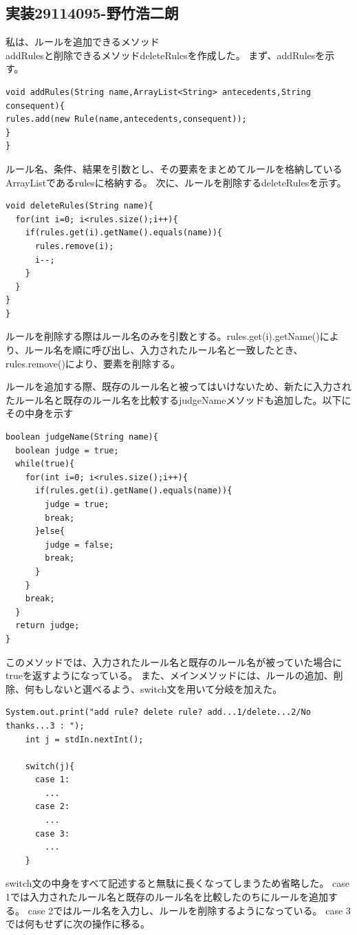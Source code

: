 \documentclass{jarticle}
\begin{document}
\subsection{実装29114095-野竹浩二朗}
私は、ルールを追加できるメソッド\\
addRulesと削除できるメソッドdeleteRulesを作成した。
まず、addRulesを示す。
\begin{lstlisting}[caption=addRulesメソッド]
void addRules(String name,ArrayList<String> antecedents,String consequent){
rules.add(new Rule(name,antecedents,consequent));
}
}
\end{lstlisting}
ルール名、条件、結果を引数とし、その要素をまとめてルールを格納しているArrayListであるrulesに格納する。
次に、ルールを削除するdeleteRulesを示す。
\begin{lstlisting}[caption=deleteRulesメソッド]
void deleteRules(String name){
  for(int i=0; i<rules.size();i++){
    if(rules.get(i).getName().equals(name)){
      rules.remove(i);
      i--;
    }
  }
}
}
\end{lstlisting}
ルールを削除する際はルール名のみを引数とする。rules.get(i).getName()により、ルール名を順に呼び出し、入力されたルール名と一致したとき、rules.remove()により、要素を削除する。

ルールを追加する際、既存のルール名と被ってはいけないため、新たに入力されたルール名と既存のルール名を比較するjudgeNameメソッドも追加した。以下にその中身を示す
\begin{lstlisting}[caption=judgenameメソッド]
boolean judgeName(String name){
  boolean judge = true;
  while(true){
    for(int i=0; i<rules.size();i++){
      if(rules.get(i).getName().equals(name)){
        judge = true;
        break;
      }else{
        judge = false;
        break;
      }
    }
    break;
  }
  return judge;
}
\end{lstlisting}
このメソッドでは、入力されたルール名と既存のルール名が被っていた場合にtrueを返すようになっている。
また、メインメソッドには、ルールの追加、削除、何もしないと選べるよう、switch文を用いて分岐を加えた。
\begin{lstlisting}[caption=メインメソッドに追加した文]
    System.out.print("add rule? delete rule? add...1/delete...2/No thanks...3 : ");
    int j = stdIn.nextInt();

    switch(j){
      case 1:
		...
      case 2:
      	...
      case 3:
      	...
    }
\end{lstlisting}
switch文の中身をすべて記述すると無駄に長くなってしまうため省略した。
case 1では入力されたルール名と既存のルール名を比較したのちにルールを追加する。
case 2ではルール名を入力し、ルールを削除するようになっている。
case 3では何もせずに次の操作に移る。
\end{document}
